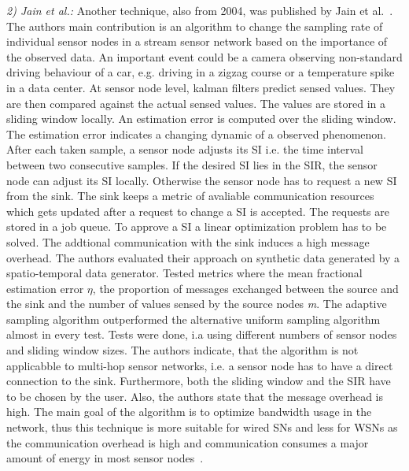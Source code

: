 \textit{2) Jain et al.:}
Another technique, also from 2004, was published by Jain et
al.~\cite{jain2004adaptive}. The authors main contribution is an algorithm to
change the sampling rate of individual sensor nodes in a stream sensor network
based on the importance of the observed data. An important event could be a
camera observing non-standard driving behaviour of a car, e.g. driving in a
zigzag course or a temperature spike in a data center. At sensor node level,
kalman filters predict sensed values. They are then compared against the actual
sensed values. The values are stored in a sliding window locally. An estimation
error is computed over the sliding window. The estimation error indicates a
changing dynamic of a observed phenomenon. After each taken sample, a sensor
node adjusts its \ac{SI} i.e. the time interval between two consecutive
samples. If the desired \ac{SI} lies in the \ac{SIR}, the sensor node can
adjust its \ac{SI} locally. Otherwise the sensor node has to request a new
\ac{SI} from the sink. The sink keeps a metric of avaliable communication
resources which gets updated after a request to change a \ac{SI} is accepted.
The requests are stored in a job queue. To approve a \ac{SI} a linear
optimization problem has to be solved. The addtional communication with the
sink induces a high message overhead. The authors evaluated their approach on
synthetic data generated by a spatio-temporal data generator. Tested metrics
where the mean fractional estimation error $ \eta $, the proportion of messages
exchanged between the source and the sink and the number of values sensed by
the source nodes \textit{m}. The adaptive sampling algorithm outperformed the
alternative uniform sampling algorithm almost in every test. Tests were done,
i.a using different numbers of sensor nodes and sliding window sizes. The
authors indicate, that the algorithm is not applicabble to multi-hop sensor
networks, i.e. a sensor node has to have a direct connection to the sink.
Furthermore, both the sliding window and the \ac{SIR} have to be chosen by the
user. Also, the authors state that the message overhead is high. The main goal
of the algorithm is to optimize bandwidth usage in the network, thus this
technique is more suitable for wired \acp{SN} and less for \acp{WSN} as the
communication overhead is high and communication consumes a major amount of
energy in most sensor nodes~\cite{raghunathan2002energy}.

\par


